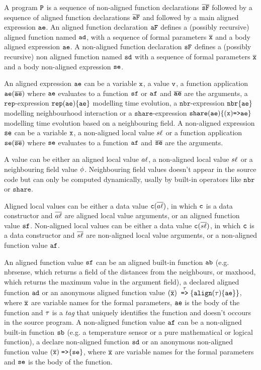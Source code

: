 A program $\mathtt{P}$ is a sequence of non-aligned function declarations $\overline{\mathtt{sF}}$ followed by a sequence of aligned function declarations $\overline{\mathtt{aF}}$ and followed by a main aligned expression $\mathtt{ae}$. An aligned function declaration $\mathtt{aF}$ defines a (possibly recursive) aligned function named $\mathtt{ad}$, with a sequence of formal parameters $\overline{\mathtt{x}}$ and a body aligned expression $\mathtt{ae}$. A non-aligned function declaration $\mathtt{sF}$ defines a (possibly recursive) non aligned function named $\mathtt{sd}$ with a sequence of formal parameters $\overline{\mathtt{x}}$ and a body non-aligned expression $\mathtt{se}$. 

An aligned expression $\mathtt{ae}$ can be a variable $\mathtt{x}$, a value $\mathtt{v}$, a function application $\mathtt{ae}(\overline{\mathtt{ae}})$ where $\mathtt{ae}$ evaluates to a function $\mathtt{sf}$ or $\mathtt{af}$ and $\overline{\mathtt{ae}}$ are the arguments, a $\mathtt{rep}$-expression $\mathtt{rep}(\mathtt{ae})\{ \mathtt{ae} \}$ modelling time evolution, a $\mathtt{nbr}$-expression $\mathtt{nbr}\{\mathtt{ae}\}$ modelling neighbourhood interaction or a $\mathtt{share}$-expression $\mathtt{share}(\mathtt{ae})\{(\mathtt{x}) \mathrm{ \texttt{=>}\mathtt{ae} } \}$ modelling time evolution based on a neighbouring field. A non-aligned expression $\mathtt{se}$ can be a variable $\mathtt{x}$, a non-aligned local value $s\ell$ or a function application $\mathtt{se}(\overline{\mathtt{se}})$ where $\mathtt{se}$ evaluates to a function $\mathtt{af}$ and $\overline{\mathtt{se}}$ are the arguments.

A value can be either an aligned local value $a\ell$, a non-aligned local value $s\ell$ or a neighbouring field value $\phi$. Neighbouring field values doesn't appear in the source code but can only be computed dynamically, usally by built-in operators like $\mathtt{nbr}$ or $\mathtt{share}$.

Aligned local values can be either a data value $\mathtt{c}(\overline{a\ell})$, in which $\mathtt{c}$ is a data constructor and $\overline{a\ell}$ are aligned local value arguments, or an aligned function value $\mathtt{sf}$. Non-aligned local values can be either a data value $\mathtt{c}(\overline{s\ell})$, in which $\mathtt{c}$ is a data constructor and $\overline{s\ell}$ are non-aligned local value arguments, or a non-aligned function value $\mathtt{af}$.

An aligned function value $\mathtt{sf}$ can be an aligned built-in function $\mathtt{ab}$ (e.g. nbrsense, which returns a field of the distances from the neighbours, or maxhood, which returns the maximum value in the argument field), a declared aligned function $\mathtt{ad}$ or an anonymous aligned function value $ (\overline{\mathtt{x}}) \; \stackrel{\tau}{\mathrm{\texttt{=>}}}{\{\mathtt{align}(\tau)\{\mathtt{ae}\}\}}$, where $\overline{\mathtt{x}}$ are variable names for the formal parameters, $\mathtt{ae}$ is the body of the function and $\tau$ is a \textit{tag} that uniquely identifies the function and doesn't occours in the source program. A non-aligned function value $\mathtt{af}$ can be a non-aligned built-in function $\mathtt{sb}$ (e.g. a temperature sensor or a pure mathematical or logical function), a declare non-aligned function $\mathtt{sd}$ or an anonymous non-aligned function value $(\overline{\mathtt{x}}) \; \mathrm{ \texttt{=>}\{ } \mathtt{se} \}$, where $\overline{\mathtt{x}}$ are variable names for the formal parameters and $\mathtt{se}$ is the body of the function.

